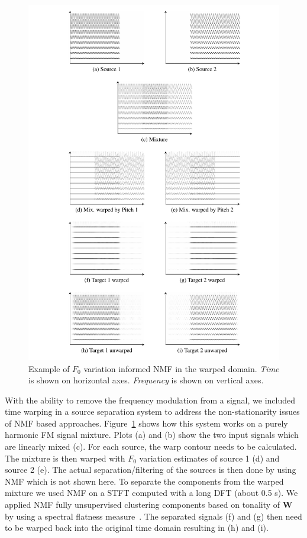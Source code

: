 \begin{figure}
  \includegraphics[width=\textwidth]{Chapters/05_Separation_Known/figures/toy.pdf}
\caption{Example of $F_0$ variation informed \acs{NMF} in the warped domain. \textit{Time} is shown on horizontal axes. \textit{Frequency} is shown on vertical axes.}%
\label{fig:warpingdemo}
\end{figure}

With the ability to remove the frequency modulation from a signal, we included time warping in a source separation system to address the non-stationarity issues of \acs{NMF} based approaches. 
Figure~\ref{fig:warpingdemo} shows how this system works on a purely harmonic FM signal mixture. 
Plots (a) and (b) show the two input signals which are linearly mixed (c). 
For each source, the warp contour needs to be calculated. 
The mixture is then warped with $F_0$ variation estimates of source 1 (d) and source 2 (e). 
The actual separation/filtering of the sources is then done by using \acs{NMF} which is not shown here. 
To separate the components from the warped mixture we used \acs{NMF} on a \acs{STFT} computed with a long DFT (about 0.5 s). 
We applied \acs{NMF} fully unsupervised clustering components based on tonality of $\textbf{W}$ by using a spectral flatness measure~\cite{gray74}. The separated signals (f) and (g) then need to be warped back into the original time domain resulting in (h) and (i).


